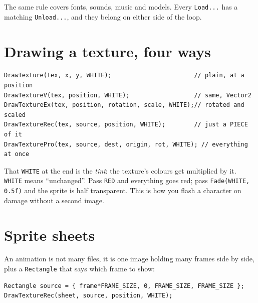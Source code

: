 The same rule covers fonts, sounds, music and models. Every
\lstinline|Load...| has a matching \lstinline|Unload...|, and they belong on
either side of the loop.

\section{Drawing a texture, four ways}

\begin{lstlisting}
DrawTexture(tex, x, y, WHITE);                       // plain, at a position
DrawTextureV(tex, position, WHITE);                  // same, Vector2
DrawTextureEx(tex, position, rotation, scale, WHITE);// rotated and scaled
DrawTextureRec(tex, source, position, WHITE);        // just a PIECE of it
DrawTexturePro(tex, source, dest, origin, rot, WHITE); // everything at once
\end{lstlisting}

That \lstinline|WHITE| at the end is the \emph{tint}: the texture's colours get
multiplied by it. \lstinline|WHITE| means ``unchanged''. Pass \lstinline|RED| and
everything goes red; pass \lstinline|Fade(WHITE, 0.5f)| and the sprite is half
transparent. This is how you flash a character on damage without a second image.

\section{Sprite sheets}

An animation is not many files, it is one image holding many frames side by side,
plus a \lstinline|Rectangle| that says which frame to show:

\begin{center}
\end{center}

\begin{lstlisting}
Rectangle source = { frame*FRAME_SIZE, 0, FRAME_SIZE, FRAME_SIZE };
DrawTextureRec(sheet, source, position, WHITE);
\end{lstlisting}

